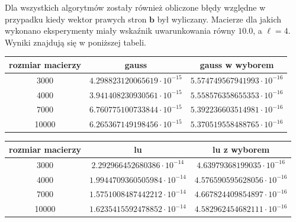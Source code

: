 \documentclass[]{article}
\newcommand{\vb}{\bm{b}}
\begin{document}
Dla wszystkich algorytmów zostały również obliczone błędy względne w przypadku kiedy wektor prawych stron $\vb$ był wyliczany. Macierze dla jakich wykonano eksperymenty miały wskaźnik uwarunkowania równy $10.0$, a $\ell=4$. Wyniki znajdują się w poniższej tabeli.

\begin{table}[!htbp]
	\centering
	\begin{tabular}{|c|c|c|}
		\hline
		rozmiar macierzy & gauss & gauss w wyborem   \\ \hline
		3000& $4.298823120065619\cdot 10^{-15}$ & $5.574749567941993\cdot 10^{-16}$   \\ \hline
		4000& $3.941408230930561\cdot 10^{-15}$ & $5.558576358655353\cdot 10^{-16}$    \\ \hline
		7000& $6.760775100733844\cdot 10^{-15}$ & $5.392236603514981\cdot 10^{-16}$  \\ \hline
		10000& $6.265367149198456\cdot 10^{-15}$ & $5.370519558488765\cdot 10^{-16}$ \\ \hline
	\end{tabular}
\end{table}

\begin{table}[!htbp]
	\centering
	\begin{tabular}{|c|c|c|}
		\hline
		rozmiar macierzy & lu & lu z wyborem  \\ \hline
		3000& $2.292966452680386\cdot 10^{-14}$ & $4.63979368199035\cdot 10^{-16}$  \\ \hline
		4000& $1.9944709360505984\cdot 10^{-14}$ & $ 4.576590595628056\cdot 10^{-16}$   \\ \hline
		7000& $1.5751008487442212\cdot 10^{-14}$ &$4.667824409854897\cdot 10^{-16}$ \\ \hline
		10000&$1.6235415592478852\cdot 10^{-14}$ & $4.582962454682111\cdot 10^{-16}$\\ \hline
	\end{tabular}
\end{table}
\end{document}

